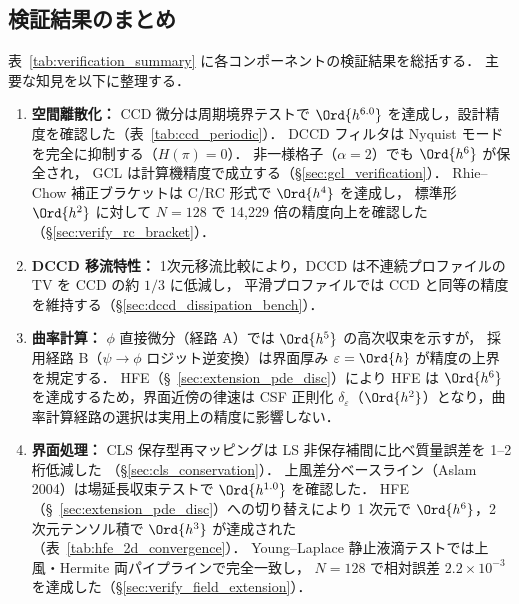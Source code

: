 %
\subsection{検証結果のまとめ}
\label{sec:verify_summary}

表~\ref{tab:verification_summary} に各コンポーネントの検証結果を総括する．
主要な知見を以下に整理する．

\begin{enumerate}
  \item \textbf{空間離散化：}
        CCD 微分は周期境界テストで $\Ord{h^{6.0}}$ を達成し，設計精度を確認した（表~\ref{tab:ccd_periodic}）．
        DCCD フィルタは Nyquist モードを完全に抑制する（$H(\pi)=0$）．
        非一様格子（$\alpha=2$）でも $\Ord{h^6}$ が保全され，
        GCL は計算機精度で成立する（§\ref{sec:gcl_verification}）．
        Rhie--Chow 補正ブラケットは C/RC 形式で $\Ord{h^4}$ を達成し，
        標準形 $\Ord{h^2}$ に対して $N{=}128$ で 14{,}229 倍の精度向上を確認した（§\ref{sec:verify_rc_bracket}）．
  \item \textbf{DCCD 移流特性：}
        1次元移流比較により，DCCD は不連続プロファイルの TV を CCD の約 $1/3$ に低減し，
        平滑プロファイルでは CCD と同等の精度を維持する（§\ref{sec:dccd_dissipation_bench}）．
  \item \textbf{曲率計算：}
        $\phi$ 直接微分（経路 A）では $\Ord{h^5}$ の高次収束を示すが，
        採用経路 B（$\psi \to \phi$ ロジット逆変換）は界面厚み $\varepsilon = \Ord{h}$ が精度の上界を規定する．
        HFE（§~\ref{sec:extension_pde_disc}）により
        HFE は $\Ord{h^6}$ を達成するため，界面近傍の律速は
        CSF 正則化 $\delta_\varepsilon$（$\Ord{h^2}$）となり，曲率計算経路の選択は実用上の精度に影響しない．
  \item \textbf{界面処理：}
        CLS 保存型再マッピングは LS 非保存補間に比べ質量誤差を 1--2 桁低減した
        （§\ref{sec:cls_conservation}）．
        上風差分ベースライン（Aslam 2004）は場延長収束テストで $\Ord{h^{1.0}}$ を確認した．
        HFE（§~\ref{sec:extension_pde_disc}）への切り替えにより
        1 次元で $\Ord{h^6}$，2 次元テンソル積で $\Ord{h^3}$ が達成された
        （表~\ref{tab:hfe_2d_convergence}）．
        Young--Laplace 静止液滴テストでは上風・Hermite 両パイプラインで完全一致し，
        $N = 128$ で相対誤差 $2.2\times10^{-3}$ を達成した（§\ref{sec:verify_field_extension}）．

\end{enumerate}

